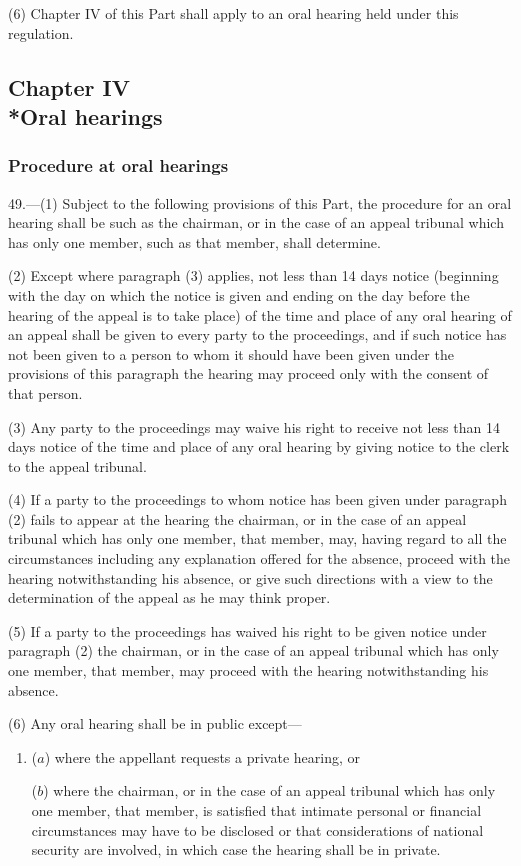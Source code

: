 \documentclass[12pt,a4paper]{article}
\begin{document}
(6) Chapter IV of this Part shall apply to an oral hearing held under this regulation.

\subsection[Chapter IV --- Oral hearings]{Chapter IV\\*Oral hearings}

\renewcommand\parthead{--- Part V Chapter IV}

\subsubsection[49. Procedure at oral hearings]{Procedure at oral hearings}

49.—(1) Subject to the following provisions of this Part, the procedure for an oral hearing shall be such as the chairman, or in the case of an appeal tribunal which has only one member, such as that member, shall determine.

(2) Except where paragraph (3) applies, not less than 14 days notice (beginning with the day on which the notice is given and ending on the day before the hearing of the appeal is to take place) of the time and place of any oral hearing of an appeal shall be given to every party to the proceedings, and if such notice has not been given to a person to whom it should have been given under the provisions of this paragraph the hearing may proceed only with the consent of that person.

(3) Any party to the proceedings may waive his right to receive not less than 14 days notice of the time and place of any oral hearing by giving notice to the clerk to the appeal tribunal.

(4) If a party to the proceedings to whom notice has been given under paragraph (2) fails to appear at the hearing the chairman, or in the case of an appeal tribunal which has only one member, that member, may, having regard to all the circumstances including any explanation offered for the absence, proceed with the hearing notwithstanding his absence, or give such directions with a view to the determination of the appeal as he may think proper.

(5) If a party to the proceedings has waived his right to be given notice under paragraph (2) the chairman, or in the case of an appeal tribunal which has only one member, that member, may proceed with the hearing notwithstanding his absence.

(6) Any oral hearing shall be in public except—
\begin{enumerate}\item[]
($a$) where the appellant requests a private hearing, or

($b$) where the chairman, or in the case of an appeal tribunal which has only one member, that member, is satisfied that intimate personal or financial circumstances may have to be disclosed or that considerations of national security are involved, in which case the hearing shall be in private.
\end{enumerate}
\end{document}
